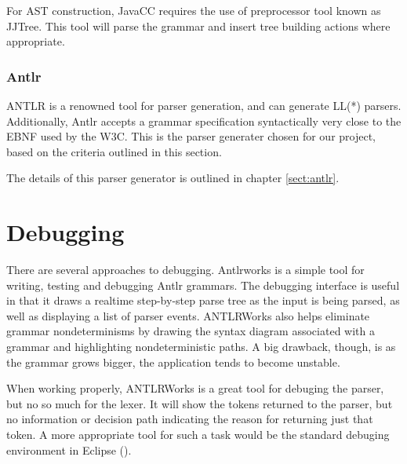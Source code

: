 For AST construction, JavaCC requires the use of preprocessor tool known as  
JJTree. This tool will parse the grammar and insert tree building actions where
appropriate. 

\subsubsection{Antlr}
ANTLR is a renowned tool for parser generation, and can generate LL(*) parsers.
Additionally, Antlr accepts a grammar specification syntactically very close to
the EBNF used by the W3C. This is the parser generater chosen for our project,
based on the criteria outlined in this section.

The details of this parser generator is outlined in chapter \ref{sect:antlr}.

\section{Debugging}
\label{sect:method:debugging}
There are several approaches to debugging. Antlrworks \cite{antlrwrks00} is a
simple tool for writing, testing and debugging Antlr grammars. The debugging
interface is useful in that it draws a realtime step-by-step parse tree as the
input is being parsed, as well as displaying a list of parser events.
ANTLRWorks also helps eliminate grammar nondeterminisms by drawing the syntax
diagram associated with a grammar and highlighting nondeterministic paths. A
big drawback, though, is as the grammar grows bigger, the application tends to
become unstable.    

When working properly, ANTLRWorks is a great tool for debuging the parser, but
no so much for the lexer. It will show the tokens returned to the parser, but
no information or decision path indicating the reason for returning just that
token. A more appropriate tool for such a task would be the standard debuging
environment in Eclipse (\cite{eclipse}).    
